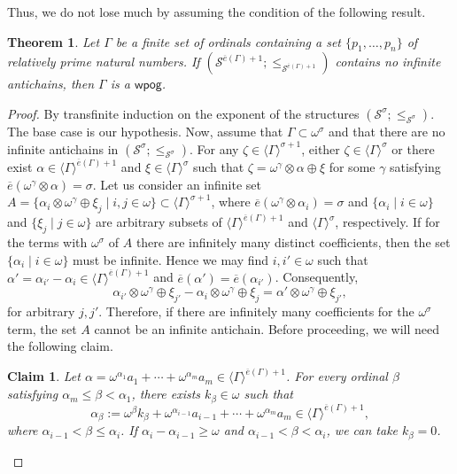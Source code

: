 \documentclass[reqno]{amsart}
\newtheorem{theorem}{Theorem}[section]
\theoremstyle{definition}
\theoremstyle{definition}
\theoremstyle{plain} %
\newtheorem*{claim}{Claim}
\begin{document}
Thus, we do not lose much by assuming the condition of the following result.
\begin{theorem}\label{charwpog}
    Let $\Gamma$ be a finite set of ordinals containing a set $\{p_1,\dots,p_n\}$ of relatively prime natural numbers. If $(\mathcal{S}^{\overline{e}(\Gamma)+1};\leq_{\mathcal{S}^{\overline{e}(\Gamma)+1}})$ contains no infinite antichains, then $\Gamma$ is a $\mathsf{wpog}$.
\end{theorem}
\begin{proof}
    By transfinite induction on the exponent of the structures $(\mathcal{S}^{\sigma};\leq_{\mathcal{S}^{\sigma}})$. The base case is our hypothesis. Now, assume that $\Gamma\subset\omega^{\sigma}$ and that there are no infinite antichains in $(\mathcal{S}^{\sigma};\leq_{\mathcal{S}^{\sigma}})$. For any $\zeta \in \langle \Gamma \rangle^{\sigma + 1}$, either $\zeta\in\langle\Gamma\rangle^{\sigma}$ or there exist $\alpha \in \langle \Gamma \rangle^{\overline{e}(\Gamma) + 1}$ and $\xi \in \langle \Gamma \rangle^{\sigma}$ such that $\zeta = \omega^{\gamma} \otimes \alpha \oplus \xi$ for some $\gamma $ satisfying $\overline{e}(\omega^\gamma\otimes\alpha)=\sigma $. Let us consider an infinite set \( A= \{\alpha_i \otimes \omega^{\gamma} \oplus \xi_j \mid i,j \in \omega\}\subset\langle\Gamma\rangle^{\sigma+1}\), where $\overline{e}(\omega^\gamma\otimes\alpha_i)=\sigma $ and $\{\alpha_i \mid i\in\omega\}$ and $\{\xi_j \mid j\in\omega\}$ are arbitrary subsets of $\langle \Gamma \rangle^{\overline{e}(\Gamma)+1}$ and $\langle \Gamma \rangle^{\sigma}$, respectively. If for the terms with $\omega^\sigma$ of $A$ there are infinitely many distinct coefficients, then the set $\{\alpha_i \mid i\in\omega\}$ must be infinite. Hence we may find $i,i'\in\omega$ such that $\alpha' = \alpha_{i'} - \alpha_i \in \langle \Gamma \rangle^{\overline{e}(\Gamma)+1}$ and $\overline{e}(\alpha') = \overline{e}(\alpha_{i'})$. Consequently, \[ \alpha_{i'} \otimes \omega^{\gamma} \oplus \xi_{j'} -\alpha_i \otimes \omega^{\gamma} \oplus \xi_j = \alpha' \otimes \omega^{\gamma} \oplus \xi_{j'}, \] for arbitrary $j,j'$. Therefore, if there are infinitely many coefficients for the $\omega^\sigma$ term, the set $A$ cannot be an infinite antichain. Before proceeding, we will need the following claim.
\begin{claim}
    Let $\alpha=\omega^{\alpha_1} a_1 + \cdots + \omega^{\alpha_m} a_m\in \langle \Gamma \rangle^{\overline{e}(\Gamma)+1}$. For every ordinal $\beta$ satisfying $\alpha_m\leq\beta<\alpha_1 $, there exists $k_{\beta}\in \omega$ such that \[\alpha_\beta:=\omega^{\beta}k_{\beta}  + \omega^{\alpha_{i-1}} a_{i-1}+ \cdots + \omega^{\alpha_m} a_m \in\langle \Gamma \rangle^{\overline{e}(\Gamma)+1}, \] where $\alpha_{i-1}<\beta\leq\alpha_i$. If $\alpha_i-\alpha_{i-1}\geq\omega$ and $\alpha_{i-1}<\beta<\alpha_i$, we can take $k_\beta=0$.

\end{claim}
\end{proof}
\end{document}

